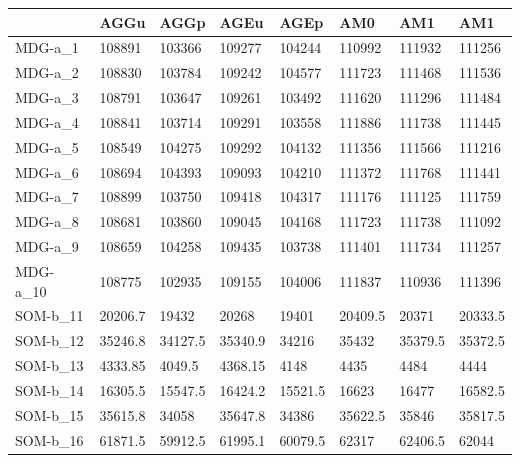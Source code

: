 \documentclass[11pt,a4paper]{article}
\begin{document}
	\begin{table}[H]
		\begin{tabular}{l|l|l|l|l|l|l|l|}
			\cline{2-8}
			& AGGu    & AGGp    & AGEu    & AGEp    & AM0     & AM1     & AM1     \\ \hline
			\multicolumn{1}{|l|}{MDG-a\_1}  & 108891  & 103366  & 109277  & 104244  & 110992  & 111932  & 111256  \\ \hline
			\multicolumn{1}{|l|}{MDG-a\_2}  & 108830  & 103784  & 109242  & 104577  & 111723  & 111468  & 111536  \\ \hline
			\multicolumn{1}{|l|}{MDG-a\_3}  & 108791  & 103647  & 109261  & 103492  & 111620  & 111296  & 111484  \\ \hline
			\multicolumn{1}{|l|}{MDG-a\_4}  & 108841  & 103714  & 109291  & 103558  & 111886  & 111738  & 111445  \\ \hline
			\multicolumn{1}{|l|}{MDG-a\_5}  & 108549  & 104275  & 109292  & 104132  & 111356  & 111566  & 111216  \\ \hline
			\multicolumn{1}{|l|}{MDG-a\_6}  & 108694  & 104393  & 109093  & 104210  & 111372  & 111768  & 111441  \\ \hline
			\multicolumn{1}{|l|}{MDG-a\_7}  & 108899  & 103750  & 109418  & 104317  & 111176  & 111125  & 111759  \\ \hline
			\multicolumn{1}{|l|}{MDG-a\_8}  & 108681  & 103860  & 109045  & 104168  & 111723  & 111738  & 111092  \\ \hline
			\multicolumn{1}{|l|}{MDG-a\_9}  & 108659  & 104258  & 109435  & 103738  & 111401  & 111734  & 111257  \\ \hline
			\multicolumn{1}{|l|}{MDG-a\_10} & 108775  & 102935  & 109155  & 104006  & 111837  & 110936  & 111396  \\ \hline
			\multicolumn{1}{|l|}{SOM-b\_11} & 20206.7 & 19432   & 20268   & 19401   & 20409.5 & 20371   & 20333.5 \\ \hline
			\multicolumn{1}{|l|}{SOM-b\_12} & 35246.8 & 34127.5 & 35340.9 & 34216   & 35432   & 35379.5 & 35372.5 \\ \hline
			\multicolumn{1}{|l|}{SOM-b\_13} & 4333.85 & 4049.5  & 4368.15 & 4148    & 4435    & 4484    & 4444    \\ \hline
			\multicolumn{1}{|l|}{SOM-b\_14} & 16305.5 & 15547.5 & 16424.2 & 15521.5 & 16623   & 16477   & 16582.5 \\ \hline
			\multicolumn{1}{|l|}{SOM-b\_15} & 35615.8 & 34058   & 35647.8 & 34386   & 35622.5 & 35846   & 35817.5 \\ \hline
			\multicolumn{1}{|l|}{SOM-b\_16} & 61871.5 & 59912.5 & 61995.1 & 60079.5 & 62317   & 62406.5 & 62044   \\ \hline

\end{tabular}
\end{table}
\end{document}
